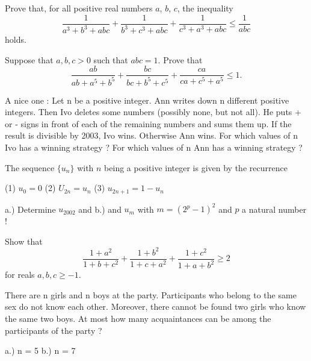 Prove that, for all positive real numbers $ a$, $ b$, $ c$, the inequality
\[ \frac {1}{a^3 + b^3 + abc} + \frac {1}{b^3 + c^3 + abc} + \frac {1}{c^3 + a^3 + abc} \leq \frac {1}{abc} \]
holds.
\eq

Suppose that $a, b, c > 0$ such that $abc = 1$. Prove that \[ \frac{ab}{ab + a^5 + b^5} + \frac{bc}{bc + b^5 + c^5} + \frac{ca}{ca + c^5 + a^5} \leq 1. \]
\eq

\bq{}{}
A nice one :
Let n be a positive integer. Ann writes down n different positive integers. Then Ivo deletes some numbers (possibly none, but not all). He puts + or - signs in front of each of the remaining numbers and sums them up. If the result is divisible by 2003, Ivo wins. Otherwise Ann wins. For which values of n Ivo has a winning strategy ? For which values of n Ann has a winning strategy ?
\eq

\bq{}{}
The sequence $\{u_n\}$ with $n$ being a positive integer is given by the recurrence

(1) $u_{0} = 0$
(2) $U_{2n} = u_{n}$
(3) $u_{2n+1} = 1 - u_{n}$

a.) Determine $u_{2002}$ and
b.) and $u_{m}$ with $m = (2^p-1)^2$ and $p$ a natural number !
\eq


\eq

\bq{}{}
Show that
\[\frac{1+a^2}{1+b+c^2}+\frac{1+b^2}{1+c+a^2} +\frac{1+c^2}{1+a+b^2} \geq 2\]
for reals $a,b,c \geq -1$.
\eq

\bq{}{}
There are n girls and n boys at the party. Participants who belong to the same sex do not know each other. Moreover, there cannot be found two girls who know the same two boys. At most how many acquaintances can be among the participants of the party ?

a.) n = 5
b.) n = 7
\eq